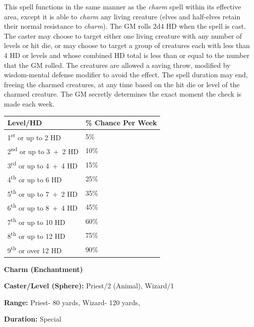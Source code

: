 \begin{multicols}{2}
This spell functions in the same manner as the \textit{charm} spell within its effective area, except it is able to \textit{charm} any living creature (elves and half-elves retain their normal resistance to \textit{charm}).  The GM rolls 2d4 HD when the spell is cast.  The caster may choose to target either one living creature with any number of levels or hit die, or may choose to target a group of creatures each with less than 4 HD or levels and whose combined HD total is less than or equal to the number that the GM rolled.  The creatures are allowed a saving throw, modified by wisdom-mental defense modifier to avoid the effect.  The spell duration may end, freeing the charmed creatures, at any time based on the hit die or level of the charmed creature.  The GM secretly determines the exact moment the check is made each week.  

\noindent
\begin{tabular}{|p{}|p{}|}
\hline
Level/HD	& \% Chance Per Week \\
\hline\hline
\rowcolor[gray]{.9}1\textsuperscript{st} or up to 2 HD	& 5\% \\
2\textsuperscript{nd} or up to 3~+~2 HD	& 10\% \\
\rowcolor[gray]{.9}3\textsuperscript{rd} or up to 4~+~4 HD	& 15\% \\
4\textsuperscript{th} or up to 6 HD	& 25\% \\
\rowcolor[gray]{.9}5\textsuperscript{th} or up to 7~+~2 HD	& 35\% \\
6\textsuperscript{th} or up to 8~+~4 HD	& 45\% \\
\rowcolor[gray]{.9}7\textsuperscript{th} or up to 10 HD	& 60\% \\
8\textsuperscript{th} or up to 12 HD	& 75\% \\
\rowcolor[gray]{.9}9\textsuperscript{th} or over 12 HD	& 90\% \\
\hline
\end{tabular}

\vspace{1em}

\noindent
\begin{minipage}{\columnwidth}

\noindent \textbf{Charm (Enchantment)}

\noindent \textbf{Caster/Level (Sphere):} Priest/2 (Animal), Wizard/1

\noindent \textbf{Range:} Priest- 80 yards, Wizard- 120 yards,

\noindent \textbf{Duration:} Special


\end{minipage}
\end{multicols}
